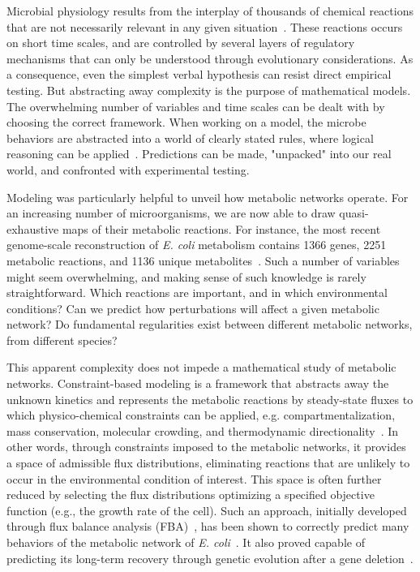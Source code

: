 Microbial physiology results from the interplay of thousands of chemical reactions that are not necessarily relevant in any given situation~\cite{schaechter_microbe_2006}.
These reactions occurs on short time scales, and are controlled by several layers of regulatory mechanisms that can only be understood through evolutionary considerations.
As a consequence, even the simplest verbal hypothesis can resist direct empirical testing.
But abstracting away complexity is the purpose of mathematical models.
The overwhelming number of variables and time scales can be dealt with by choosing the correct framework.
When working on a model, the microbe behaviors are abstracted into a world of clearly stated rules, where logical reasoning can be applied~\cite{servedio_not_2014,mcgill_calm_2013}.
Predictions can be made, "unpacked" into our real world, and confronted with experimental testing.

Modeling was particularly helpful to unveil how metabolic networks operate.
For an increasing number of microorganisms, we are now able to draw quasi-exhaustive maps of their metabolic reactions.
For instance, the most recent genome-scale reconstruction of \textit{E. coli} metabolism contains 1366 genes, 2251 metabolic reactions, and 1136 unique metabolites~\cite{orth_comprehensive_2011}.
Such a number of variables might seem overwhelming, and making sense of such knowledge is rarely straightforward.
Which reactions are important, and in which environmental conditions?
Can we predict how perturbations will affect a given metabolic network?
Do fundamental regularities exist between different metabolic networks, from different species?

This apparent complexity does not impede a mathematical study of metabolic networks.
Constraint-based modeling is a framework that abstracts away the unknown kinetics and represents the metabolic reactions by steady-state fluxes to which physico-chemical constraints can be applied, e.g. compartmentalization, mass conservation, molecular crowding, and thermodynamic directionality~\cite{ebrahim_cobrapy_2013}.
In other words, through constraints imposed to the metabolic networks, it provides a space of admissible flux distributions, eliminating reactions that are unlikely to occur in the environmental condition of interest.
This space is often further reduced by selecting the flux distributions optimizing a specified objective function (e.g., the growth rate of the cell).
Such an approach, initially developed through flux balance analysis (FBA)~\cite{orth_comprehensive_2011,palsson_systems_2011}, has been shown to correctly predict many behaviors of the metabolic network of \textit{E. coli}~\cite{varma_stoichiometric_1994,edwards_silico_2001}.
It also proved capable of predicting its long-term recovery through genetic evolution after a gene deletion~\cite{fong_metabolic_2004}.

